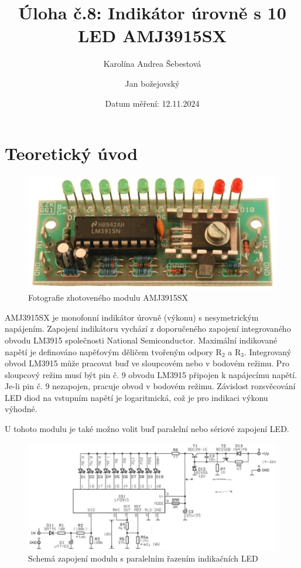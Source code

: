 \documentclass[a4paper, czech]{article}
\title{Úloha č.8: Indikátor úrovně s 10 LED AMJ3915SX}
\author{Karolína Andrea Šebestová \and Jan božejovský}
\date{Datum měření: 12.11.2024}
\begin{document}
\maketitle

\section{Teoretický úvod}

\begin{figure}[H]
    \centering
    \includegraphics{amj3915sx_foto.png}
    \caption{Fotografie zhotoveného modulu AMJ3915SX}
\end{figure}

AMJ3915SX je monofonní indikátor úrovně (výkonu) s nesymetrickým napájením.
Zapojení indikátoru vychází z doporučeného zapojení integrovaného obvodu LM3915 společnosti National Semiconductor.
Maximální indikované napětí je definováno napěťovým děličem tvořeným odpory R$_2$ a R$_3$.
Integrovaný obvod LM3915 může pracovat buď ve sloupcovém nebo v bodovém režimu.
Pro sloupcový režim musí být pin č. 9 obvodu LM3915 připojen k napájecímu napětí.
Je-li pin č. 9 nezapojen, pracuje obvod v bodovém režimu.
Závislost rozsvěcování LED diod na vstupním napětí je logaritmická, což je pro indikaci výkonu výhodné.

U tohoto modulu je také možno volit buď paralelní nebo sériové zapojení LED.

\begin{figure}[H]
    \centering
    \includegraphics[width=\textwidth]{amj3915sx_schema_paralelni.png}
    \caption{Schemá zapojení modulu s paralelním řazením indikačních LED}
\end{figure}
\end{document}
